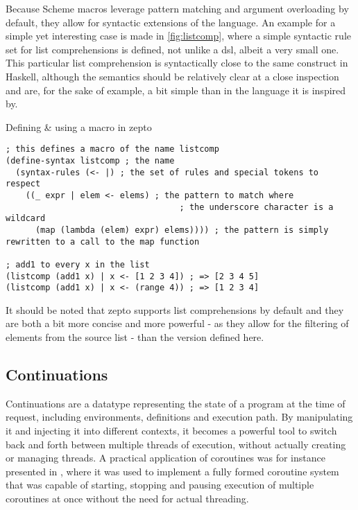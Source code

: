 \documentclass[oneside,11pt,xetex]{scrbook}
\begin{document}
Because Scheme macros leverage pattern matching and argument overloading by default,
they allow for syntactic extensions of the language. An example for a simple yet
interesting case is made in \ref{fig:listcomp}, where a simple syntactic rule set
for list comprehensions is defined, not unlike a \gls{dsl}, albeit a very small one.
This particular list comprehension is syntactically close to the same construct in
Haskell, although the semantics should be relatively clear at a close inspection and
are, for the sake of example, a bit simple than in the language it is inspired by.

\begin{listing}[H]
\caption{Defining \& using a macro in zepto}
\begin{verbatim}
; this defines a macro of the name listcomp
(define-syntax listcomp ; the name
  (syntax-rules (<- |) ; the set of rules and special tokens to respect
    ((_ expr | elem <- elems) ; the pattern to match where
                                   ; the underscore character is a wildcard
      (map (lambda (elem) expr) elems)))) ; the pattern is simply rewritten to a call to the map function

; add1 to every x in the list
(listcomp (add1 x) | x <- [1 2 3 4]) ; => [2 3 4 5]
(listcomp (add1 x) | x <- (range 4)) ; => [1 2 3 4]
\end{verbatim}
\end{listing}
\label{fig:listcomp}

It should be noted that zepto supports list comprehensions by default and they are
both a bit more concise and more powerful - as they allow for the filtering of
elements from the source list - than the version defined here.

\subsection{Continuations}
\label{continuation}

Continuations are a datatype representing the state of a program at the time of
request, including environments, definitions and execution path. By manipulating
it and injecting it into different contexts, it becomes a powerful tool to switch
back and forth between multiple threads of execution, without actually creating
or managing threads. A practical application of coroutines was for instance
presented in \parencite{COR}, where it was used to implement a fully formed
coroutine system that was capable of starting, stopping and pausing execution
of multiple coroutines at once without the need for actual threading.
\end{document}
